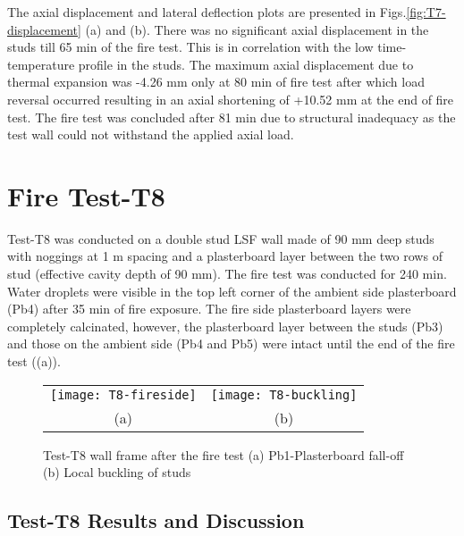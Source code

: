 The axial displacement and lateral deflection plots are presented in Figs.\ref{fig:T7-displacement} (a) and (b). There was no significant axial displacement in the studs till 65 min of the fire test. This is in correlation with the low time-temperature profile in the studs. The maximum axial displacement due to thermal expansion was -4.26 mm only at 80 min of fire test after which load reversal occurred resulting in an axial shortening of +10.52 mm at the end of fire test. The fire test was concluded after 81 min due to structural inadequacy as the test wall could not withstand the applied axial load. 

\section{Fire Test-T8}

Test-T8 was conducted on a double stud LSF wall made of 90 mm deep studs with noggings at 1 m spacing and a plasterboard layer between the two rows of stud (effective cavity depth of 90 mm). The fire test was conducted for 240 min. Water droplets were visible in the top left corner of the ambient side plasterboard (Pb4) after 35 min of fire exposure. The fire side plasterboard layers were completely calcinated, however, the plasterboard layer between the studs (Pb3) and those on the ambient side (Pb4 and Pb5) were intact until the end of the fire test ((a)). 
\begin{figure}[!htbp]
	\centering
		\begin{tabular}{cc}
			\texttt{[image: T8-fireside]} & \texttt{[image: T8-buckling]} \\ 
			(a) & (b)  \\ 
		\end{tabular} 
		\caption{Test-T8 wall frame after the fire test (a) Pb1-Plasterboard fall-off (b) Local buckling of studs}
		\label{fig:T8-fireside-buckling}
\end{figure}

\subsection{Test-T8 Results and Discussion}

